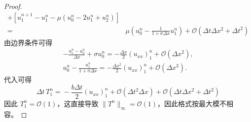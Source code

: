 \begin{proof}
\begin{align*}
        + \left[
        u_1^{n+1} - u_1^n - \mu(u_0^n - 2 u_1^n + u_2^n)
        \right]                                                                                                    \\
        ={}                    & \mu \left(u_0^n - \frac{1}{1+\sigma \Delta x} u_1^n\right)
        + \mathcal{O}(\Delta t \Delta x^2 + \Delta t^2)
    \end{align*}
    由边界条件可得
    \begin{gather*}
        -  \frac{u_1^n - u_0^n}{\Delta x} + \sigma u_0^n = -\frac{\Delta x}2 (u_{xx})_1^n + \mathcal{O}(\Delta x^2),\\
        u_0^n - \frac{u_1^n}{1+\sigma \Delta x} = -\frac{\Delta x^2}2 (u_{xx})_1^n + \mathcal{O}(\Delta x^3).
    \end{gather*}
    代入可得
    \[
        \Delta t\, T_1^{n} ={} -\frac{b \Delta t}2 (u_{xx})_1^n + \mathcal{O}(\Delta t^2 \Delta x)+ \mathcal{O}(\Delta t \Delta x^2 + \Delta t^2)
    \]
    因此 $T_1^n = \mathcal{O}(1)$，这直接导致 $\|T^n\|_{\infty} = \mathcal{O}(1)$，因此格式按最大模不相容。
\end{proof}

